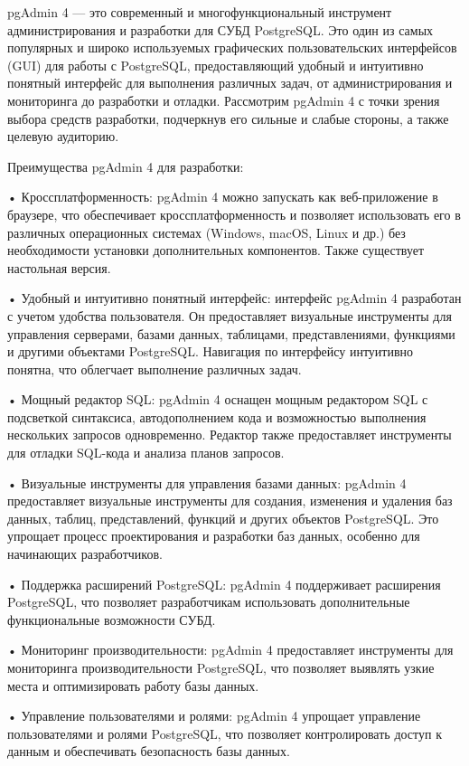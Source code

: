 pgAdmin 4 — это современный и многофункциональный инструмент администрирования и разработки для СУБД PostgreSQL. Это один из самых популярных и широко используемых графических пользовательских интерфейсов (GUI) для работы с PostgreSQL, предоставляющий удобный и интуитивно понятный интерфейс для выполнения различных задач, от администрирования и мониторинга до разработки и отладки. Рассмотрим pgAdmin 4 с точки зрения выбора средств разработки, подчеркнув его сильные и слабые стороны, а также целевую аудиторию.

Преимущества pgAdmin 4 для разработки:

•	Кроссплатформенность: pgAdmin 4 можно запускать как веб-приложение в браузере, что обеспечивает кроссплатформенность и позволяет использовать его в различных операционных системах (Windows, macOS, Linux и др.) без необходимости установки дополнительных компонентов. Также существует настольная версия.

•	Удобный и интуитивно понятный интерфейс: интерфейс pgAdmin 4 разработан с учетом удобства пользователя. Он предоставляет визуальные инструменты для управления серверами, базами данных, таблицами, представлениями, функциями и другими объектами PostgreSQL. Навигация по интерфейсу интуитивно понятна, что облегчает выполнение различных задач.

•	Мощный редактор SQL: pgAdmin 4 оснащен мощным редактором SQL с подсветкой синтаксиса, автодополнением кода и возможностью выполнения нескольких запросов одновременно. Редактор также предоставляет инструменты для отладки SQL-кода и анализа планов запросов.

•	Визуальные инструменты для управления базами данных: pgAdmin 4 предоставляет визуальные инструменты для создания, изменения и удаления баз данных, таблиц, представлений, функций и других объектов PostgreSQL. Это упрощает процесс проектирования и разработки баз данных, особенно для начинающих разработчиков.

•	Поддержка расширений PostgreSQL: pgAdmin 4 поддерживает расширения PostgreSQL, что позволяет разработчикам использовать дополнительные функциональные возможности СУБД.

•	Мониторинг производительности: pgAdmin 4 предоставляет инструменты для мониторинга производительности PostgreSQL, что позволяет выявлять узкие места и оптимизировать работу базы данных.

•	Управление пользователями и ролями: pgAdmin 4 упрощает управление пользователями и ролями PostgreSQL, что позволяет контролировать доступ к данным и обеспечивать безопасность базы данных.

